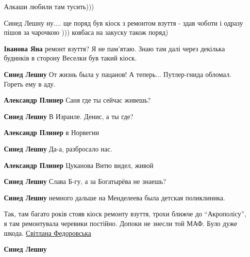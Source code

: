  
 
 
 
 

\qqSecCmt


Алкаши любили там тусить)))

\begin{itemize} %

Синед Лешну ну.... ще поряд був кіоск з ремонтом взуття - здав чоботи і одразу
пішов за чарочкою ))) ковбаса на закуску також поряд)

\textbf{Іванова Яна} ремонт взуття? Я не пам'ятаю. Знаю там далі через декілька будинків в сторону Веселки був такий кіоск.

\textbf{Синед Лешну}
От жизнь была у пацанов! А теперь... Путлер-гнида обломал. Гореть ему в аду.

\begin{itemize} %
\textbf{Александр Плинер} Саня где ты сейчас живешь?

\textbf{Синед Лешну}
В Израиле. Денис, а ты где?

\textbf{Александр Плинер} в Норвегии

\textbf{Синед Лешну}
Да-а, разбросало нас.

\textbf{Александр Плинер} Цуканова Витю видел, живой

\textbf{Синед Лешну}
Слава Б-гу, а за Богатырёва не знаешь?
\end{itemize} %

\textbf{Синед Лешну} немного дальше на Менделеева была детская поликлиника.


Так, там багато років стояв кіоск ремонту взуття, трохи ближче до \enquote{Акрополісу},
я там ремонтувала черевики постійно. Допоки не знесли той МАФ. Було дуже шкода.
\href{https://www.facebook.com/profile.php?id=100022512661420}{Світлана Федоровська}

\textbf{Синед Лешну}

\end{itemize} %

